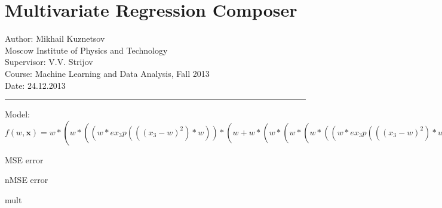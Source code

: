 \documentclass[12pt]{article}
\begin{document}
\section*{Multivariate Regression Composer}
Author: Mikhail Kuznetsov\\
Moscow Institute of Physics and Technology\\
Supervisor: V.V. Strijov\\
Course: Machine Learning and Data Analysis, Fall 2013\\
Date: 24.12.2013\\
\hrule
\vspace{1cm}
Model: $f(w,\mathbf{x})=w*(w*((w*ex_3p(((x_3-w)^2)*w))*(w+w*(w*(w*(w*((w*ex_3p(((x_3-w)^2)*w))*(w+w*(x_1)+w))^2+w*((w*ex_3p(((x_3-w)^2)*w))*(w+w*(x_1)+w))+w)))+w))^2+w*((w*ex_3p(((x_3-w)^2)*w))*(w+w*(w*(w*(w*((w*ex_3p(((x_3-w)^2)*w))*(w+w*(x_1)+w))^2+w*((w*ex_3p(((x_3-w)^2)*w))*(w+w*(x_1)+w))+w)))+w))+w)$

MSE error

nMSE error


\begin{bundle}{mult}\end{bundle}
\end{document}
